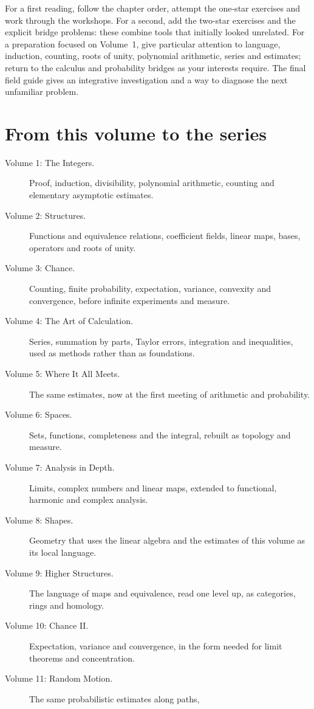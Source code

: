For a first reading, follow the chapter order, attempt the one-star exercises and
work through the workshops. For a second, add the two-star exercises and the
explicit bridge problems: these combine tools that initially looked unrelated.
For a preparation focused on Volume~1, give particular attention to language,
induction, counting, roots of unity, polynomial arithmetic, series and estimates;
return to the calculus and probability bridges as your interests require. The
final field guide gives an integrative investigation and a way to diagnose the
next unfamiliar problem.

\section*{From this volume to the series}
\begin{description}
\item[Volume 1: The Integers.] Proof, induction, divisibility, polynomial
arithmetic, counting and elementary asymptotic estimates.
\item[Volume 2: Structures.] Functions and equivalence relations, coefficient
fields, linear maps, bases, operators and roots of unity.
\item[Volume 3: Chance.] Counting, finite probability, expectation, variance,
convexity and convergence, before infinite experiments and measure.
\item[Volume 4: The Art of Calculation.] Series, summation by parts, Taylor errors,
integration and inequalities, used as methods rather than as foundations.
\item[Volume 5: Where It All Meets.] The same estimates, now at the first meeting
of arithmetic and probability.
\item[Volume 6: Spaces.] Sets, functions, completeness and the integral, rebuilt
as topology and measure.
\item[Volume 7: Analysis in Depth.] Limits, complex numbers and linear maps,
extended to functional, harmonic and complex analysis.
\item[Volume 8: Shapes.] Geometry that uses the linear algebra and the estimates
of this volume as its local language.
\item[Volume 9: Higher Structures.] The language of maps and equivalence, read
one level up, as categories, rings and homology.
\item[Volume 10: Chance II.] Expectation, variance and convergence, in the form
needed for limit theorems and concentration.
\item[Volume 11: Random Motion.] The same probabilistic estimates along paths,

\end{description}
